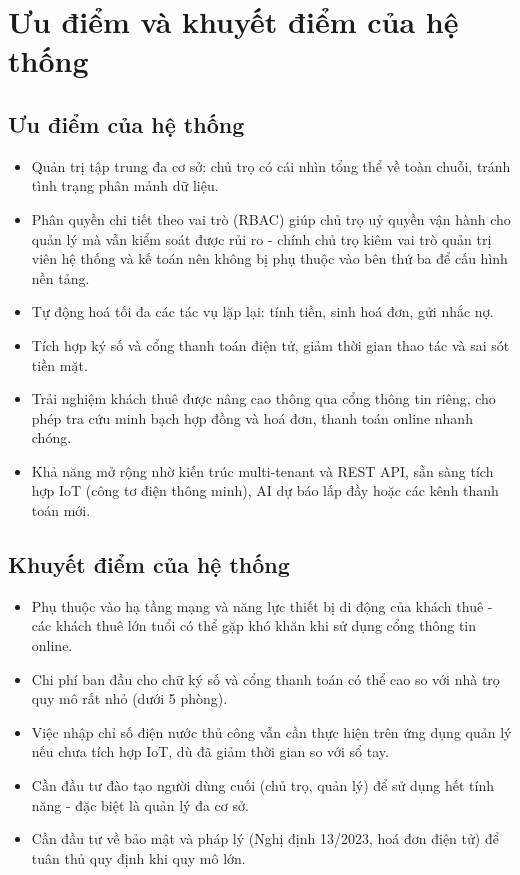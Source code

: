 \section{Ưu điểm và khuyết điểm của hệ thống}

\subsection{Ưu điểm của hệ thống}

\begin{itemize}
\item
  Quản trị tập trung đa cơ sở: chủ trọ có cái nhìn tổng thể về toàn
  chuỗi, tránh tình trạng phân mảnh dữ liệu.
\item
  Phân quyền chi tiết theo vai trò (RBAC) giúp chủ trọ uỷ quyền vận hành
  cho quản lý mà vẫn kiểm soát được rủi ro - chính chủ trọ kiêm vai trò
  quản trị viên hệ thống và kế toán nên không bị phụ thuộc vào bên thứ
  ba để cấu hình nền tảng.
\item
  Tự động hoá tối đa các tác vụ lặp lại: tính tiền, sinh hoá đơn, gửi
  nhắc nợ.
\item
  Tích hợp ký số và cổng thanh toán điện tử, giảm thời gian thao tác và
  sai sót tiền mặt.
\item
  Trải nghiệm khách thuê được nâng cao thông qua cổng thông tin riêng,
  cho phép tra cứu minh bạch hợp đồng và hoá đơn, thanh toán online
  nhanh chóng.
\item
  Khả năng mở rộng nhờ kiến trúc multi-tenant và REST API, sẵn sàng tích
  hợp IoT (công tơ điện thông minh), AI dự báo lấp đầy hoặc các kênh
  thanh toán mới.
\end{itemize}

\subsection{Khuyết điểm của hệ thống}

\begin{itemize}
\item
  Phụ thuộc vào hạ tầng mạng và năng lực thiết bị di động của khách thuê
  - các khách thuê lớn tuổi có thể gặp khó khăn khi sử dụng cổng thông
  tin online.
\item
  Chi phí ban đầu cho chữ ký số và cổng thanh toán có thể cao so với nhà
  trọ quy mô rất nhỏ (dưới 5 phòng).
\item
  Việc nhập chỉ số điện nước thủ công vẫn cần thực hiện trên ứng dụng
  quản lý nếu chưa tích hợp IoT, dù đã giảm thời gian so với sổ tay.
\item
  Cần đầu tư đào tạo người dùng cuối (chủ trọ, quản lý) để sử dụng hết
  tính năng - đặc biệt là quản lý đa cơ sở.
\item
  Cần đầu tư về bảo mật và pháp lý (Nghị định 13/2023, hoá đơn điện tử)
  để tuân thủ quy định khi quy mô lớn.
\end{itemize}

